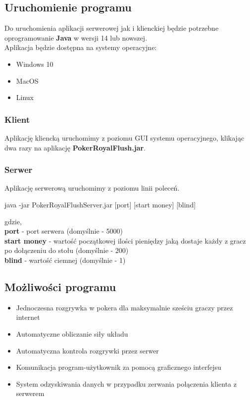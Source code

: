 \documentclass{article}
\begin{document}
    \subsection{Uruchomienie programu}
        Do uruchomienia aplikacji serwerowej jak i klienckiej będzie potrzebne oprogramowanie \textbf{Java} w wersji 14 lub nowszej.\\
        Aplikacja będzie dostępna na systemy operacyjne:
        \begin{itemize}
            \item Windows 10
            \item MacOS
            \item Linux
        \end{itemize}
        \subsubsection{Klient}
            Aplikację kliencką uruchomimy z poziomu GUI systemu operacyjnego, klikając dwa razy na aplikację \textbf{PokerRoyalFlush.jar}.
            
        \subsubsection{Serwer}
            Aplikację serwerową uruchomimy z poziomu linii poleceń.
            \begin{center}
                java -jar PokerRoyalFlushServer.jar [port] [start money] [blind]
            \end{center}
            gdzie,\\
            \textbf{port} - port serwera (domyślnie - 5000)\\
            \textbf{start money} - wartość początkowej ilości pieniędzy jaką dostaje każdy z gracz po dołączeniu do stołu (domyślnie - 200)\\
            \textbf{blind} - wartość ciemnej (domyślnie - 1)
    
    \subsection{Możliwości programu}
        \begin{itemize}
            \item Jednoczesna rozgrywka w pokera dla maksymalnie sześciu graczy przez internet
            \item Automatyczne obliczanie siły układu
            \item Automatyczna kontrola rozgrywki przez serwer
            \item Komunikacja program-użytkownik za pomocą graficznego interfejsu
            \item System odzyskiwania danych w przypadku zerwania połączenia klienta z serwerem
        \end{itemize}
\end{document}
